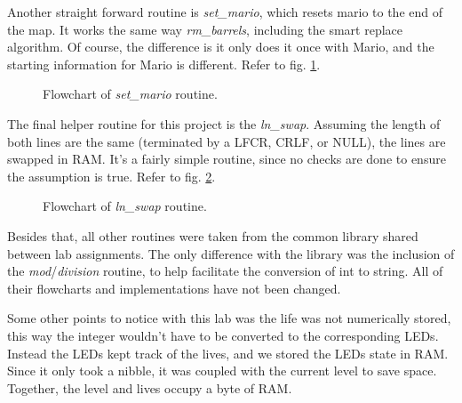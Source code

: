 \documentclass[letterpaper,10pt]{article}
\begin{document}
    \begin{minipage}{\linewidth}
        
        \label{flo:fall_mario_2}
    \end{minipage}

    Another straight forward routine is \textit{set\_mario}, which resets mario
    to the end of the map. It works the same way \textit{rm\_barrels}, including
    the smart replace algorithm. Of course, the difference is it only does it
    once with Mario, and the starting information for Mario is different.
    Refer to fig. \ref{flo:set_mario}.

    \begin{figure}[hp]
        
        \caption{Flowchart of \textit{set\_mario} routine.}
        \label{flo:set_mario}
    \end{figure}

    The final helper routine for this project is the \textit{ln\_swap}. Assuming
    the length of both lines are the same (terminated by a LFCR, CRLF, or NULL),
    the lines are swapped in RAM. It's a fairly simple routine, since no
    checks are done to ensure the assumption is true. Refer to fig.
    \ref{flo:ln_swap}.

    \begin{figure}[hp]
        
        \caption{Flowchart of \textit{ln\_swap} routine.}
        \label{flo:ln_swap}
    \end{figure}

    Besides that, all other routines were taken from the common library shared
    between lab assignments. The only difference with the library was the
    inclusion of the \textit{mod}/\textit{division} routine, to help facilitate
    the conversion of int to string. All of their flowcharts and implementations
    have not been changed.

    Some other points to notice with this lab was the life was not numerically
    stored, this way the integer wouldn't have to be converted to the corresponding
    LEDs. Instead the LEDs kept track of the lives, and we stored the LEDs state
    in RAM. Since it only took a nibble, it was coupled with the current level
    to save space. Together, the level and lives occupy a byte of RAM.
\end{document}

